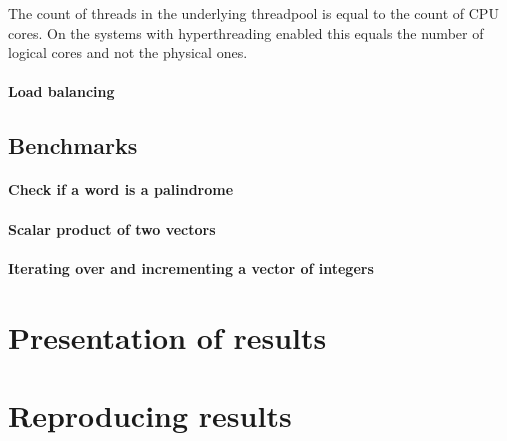 
The count of threads in the underlying threadpool is equal to the count of CPU cores. On the systems with hyperthreading enabled this equals the number of logical cores and not the physical ones. 

\paragraph*{Load balancing}

\subsection{Benchmarks}

\paragraph*{Check if a word is a palindrome}

\paragraph*{Scalar product of two vectors}

\paragraph*{Iterating over and incrementing a vector of integers}

\section{Presentation of results}

\section{Reproducing results}
